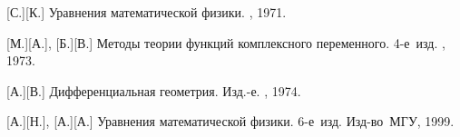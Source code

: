 \begin{thebibliography}{123}
\begin{otherlanguage}{russian}
[С.][К.] Уравнения математической физики. \naukapublisher, 1971. 

[М.][А.], [Б.][В.] Методы теории функций комплексного переменного. 4\hbox{-}е~изд. \naukapublisher, 1973. 

[А.][В.] Дифференциальная геометрия. Изд.\hbox{-}е. \naukapublisher, 1974. 

[А.][Н.], [А.][А.] Уравнения математической физики. 6\hbox{-}е~изд. Изд\hbox{-}во~МГУ, 1999. 

\end{otherlanguage}

\normalsize
\end{thebibliography}
